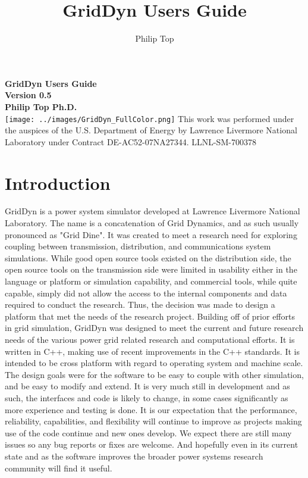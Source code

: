 \documentclass[12pt]{article} %
\title{GridDyn Users Guide}
\author{Philip Top}
\date{} %
\date{\displaydate{date}}
\begin{document}
\begin{titlepage}
    \centering
    \vfill
    {\bfseries\Large
        GridDyn Users Guide\\
        Version 0.5\\
        \vskip2cm
        Philip Top Ph.D.\\
    }
    \vfill
        \texttt{[image: ../images/GridDyn\_FullColor.png]}
    \vfill
    This work was performed under the auspices of the U.S. Department of Energy by
    Lawrence Livermore National Laboratory under Contract DE-AC52-07NA27344.
    LLNL-SM-700378
    \vfill
\end{titlepage}

\newpage
\tableofcontents
\section{Introduction}

GridDyn is a power system simulator developed at Lawrence Livermore National Laboratory. The name is a concatenation of Grid Dynamics, and as such usually pronounced as "Grid Dine". It was created to meet a research need for exploring coupling between transmission, distribution, and communications system simulations.  While good open source tools existed on the distribution side,  the open source tools on the transmission side were limited in usability either in the language or platform or simulation capability, and commercial tools, while quite capable, simply did not allow the access to the internal components and data required to conduct the research.    Thus, the decision was made to design a platform that met the needs of the research project.  Building off of prior efforts in grid simulation, GridDyn was designed to meet the current and future research needs of the various power grid related research and computational efforts.  It is written in C++, making use of recent improvements in the C++ standards.  It is intended to be cross platform with regard to operating system and machine scale.  The design goals were for the software to be easy to couple with other simulation, and be easy to modify and extend.  It is very much still in development and as such, the interfaces and code is likely to change, in some cases significantly as more experience and testing is done.   It is our expectation that the performance, reliability, capabilities, and flexibility will continue to improve as projects making use of the code continue and new ones develop.  We expect there are still many issues so any bug reports or fixes are welcome.    And hopefully even in its current state and as the software improves the broader power systems research community will find it useful.
\end{document}
